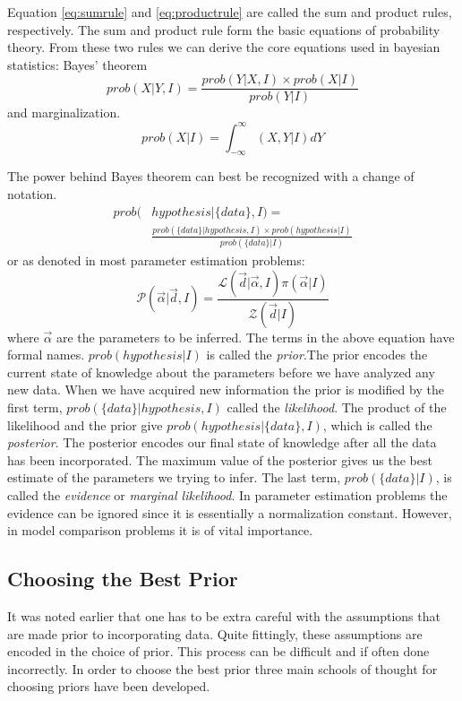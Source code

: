\documentclass[12pt]{article}
\numberwithin{equation}{section}
\begin{document}
Equation \ref{eq:sumrule} and \ref{eq:productrule} are called the sum and product 
rules, respectively. The sum and product rule form the basic equations of probability 
theory. From these two rules we can derive the core equations used in bayesian 
statistics: Bayes' theorem
\begin{equation} \label{eq:bayes1}
	prob(X|Y,I) = \frac{prob(Y|X,I) \times prob(X|I)}{prob(Y|I)}
\end{equation}
and marginalization.
\begin{equation} \label{eq:marginalization}
	prob(X|I) = \int_{-\infty}^{\infty}{(X,Y|I)dY}
\end{equation}

The power behind Bayes theorem can best be recognized with a change of notation. 
\begin{align}\label{eq:bayes2}
	prob(&hypothesis|\{data\},I) =  \nonumber \\ 
	& \frac{prob(\{data\}|hypothesis,I) \times prob(hypothesis|I)}{prob(\{data\}|I)}
\end{align}
or as denoted in most parameter estimation problems:
\begin{equation} \label{eq:bayes3}
\mathcal{P}(\vec{\alpha}|\vec{d},I) = \frac{\mathcal{L}(\vec{d}|\vec{\alpha},I)\pi(\vec{\alpha}|I)}{\mathcal{Z}(\vec{d}|I)}
\end{equation}
where $\vec{\alpha}$ are the parameters to be inferred.
The terms in the above equation have formal names. $prob(hypothesis|I)$ is 
called the \emph{prior}.The prior encodes the current state of knowledge about the parameters before 
we have analyzed any new data. 
When we have acquired new information the prior is modified by the first term, $prob(\{data\}|hypothesis,I)$ called the 
\emph{likelihood}.
The product of the likelihood and the prior give $prob(hypothesis|\{data\},I)$, 
which is called the \emph{posterior}. The posterior encodes our final state of knowledge 
after all the data has been incorporated.
The maximum value of the posterior gives us the best estimate of the parameters we trying to infer.
The last term, $prob(\{data\}|I)$, is called the \emph{evidence} or \emph{marginal likelihood}. In parameter estimation problems the 
evidence can be ignored since it is essentially a normalization constant. However, in model comparison problems it is of vital 
importance.
\subsection{Choosing the Best Prior}
It was noted earlier that one has to be extra careful with the assumptions that are made prior 
to incorporating data. Quite fittingly, these assumptions are encoded in the choice of prior. 
This process can be difficult and if often done incorrectly. In order to choose the best prior 
three main schools of thought for choosing priors have been developed. 
\end{document}
